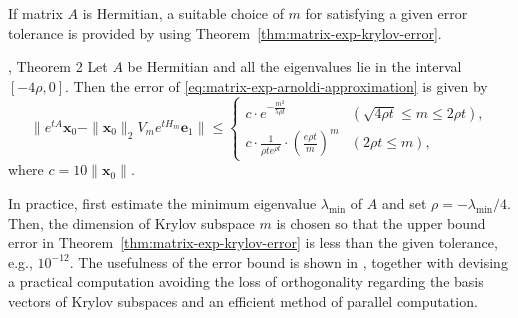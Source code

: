 {If matrix $A$ is Hermitian, a suitable choice of $m$ for satisfying a given error tolerance is provided by using Theorem~\ref{thm:matrix-exp-krylov-error}.}

\begin{Theorem}{, Theorem 2}\label{thm:matrix-exp-krylov-error}
{Let $A$ be Hermitian and all the eigenvalues lie in the interval $[-4\rho,0]$. Then the error of \eqref{eq:matrix-exp-arnoldi-approximation} is given by}
\[\|e^{tA}\boldsymbol{x}_0-\|\boldsymbol{x}_0\|_2V_me^{tH_m}\boldsymbol{e}_1\|\le\begin{cases}c\cdot e^{-\frac{m^2}{5\rho t}}&(\sqrt{4\rho t}\le m\le2\rho t),\\c\cdot\frac{1}{\rho te^{\rho t}}\cdot\left(\frac{e\rho t}{m}\right)^m&(2\rho t\le m),\end{cases}\]
{where $c=10\|\boldsymbol{x}_0\|$.}
\end{Theorem}

{In practice, first estimate the minimum eigenvalue $\lambda_{\min}$ of $A$ and set $\rho=-\lambda_{\min}/4$. Then, the dimension of Krylov subspace $m$ is chosen so that the upper bound error in Theorem~\ref{thm:matrix-exp-krylov-error} is less than the given tolerance, e.g., $10^{-12}$. The usefulness of the error bound is shown in , together with devising a practical computation avoiding the loss of orthogonality regarding the basis vectors of Krylov subspaces and an efficient method of parallel computation.}
